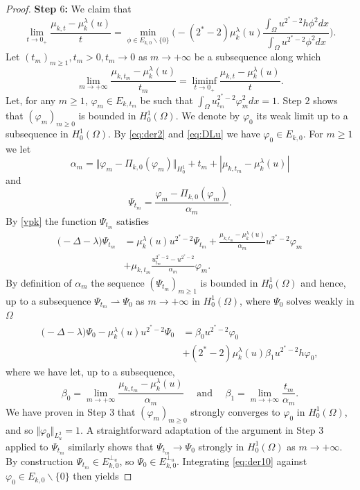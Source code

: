 \documentclass[10pt]{amsart}
\numberwithin{equation}{section}
\newcommand{\vp}{\varphi}
\newcommand{\Om}{\Omega}
\newcommand{\mkl}{\mu_{k}^{\lambda}}
\theoremstyle{plain}
\theoremstyle{remark}
\begin{document}
\begin{proof}
\medskip

 \textbf{Step $6$:} We claim that
 \begin{equation} \label{eq:der9}
\lim_{t \to 0_+} \frac{\mu_{k,t} - \mkl(u)}{t}= \min_{\phi \in E_{k,0}\backslash \{0\}} \Bigg( - (2^*-2) \mkl(u) \frac{\int_\Om u^{2^*-2}h \phi^2dx}{\int_\Om u^{2^*-2} \phi^2 dx}\Bigg).
\end{equation}
Let $(t_m)_{m \ge1}, t_m >0, t_m \to 0$ as $m \to + \infty $ be a subsequence along which 
$$ \lim_{m \to + \infty} \frac{\mu_{k,t_m} - \mkl(u)}{t_m}   = \liminf_{ t \to 0_+} \frac{\mu_{k,t} - \mkl(u)}{t}.$$
 Let, for any $m \ge 1$, $\vp_{m} \in E_{k,t_m}$ be such that $\int_\Om u_{t_m}^{2^*-2} \vp_{m}^2dx = 1$. Step $2$ shows that $(\vp_m)_{m\ge0}$ is bounded in $H^1_0(\Om)$. We denote by $\vp_0$ its weak limit up to a subsequence in $H^1_0(\Om)$. By \eqref{eq:der2} and \eqref{eq:DLu} we have $\vp_0 \in E_{k,0}$. For $m \ge 1$ we let 
$$ \alpha_m = \Vert \vp_{m} - \Pi_{k,0}(\vp_{m}) \Vert_{H^1_0} + t_m +  |\mu_{k,t_m} - \mkl(u)| $$
and 
$$ \Psi_{t_m} = \frac{\vp_{m} - \Pi_{k,0}(\vp_{m})}{\alpha_m}. $$
By \eqref{vpk} the function $\Psi_{t_m}$ satisfies
$$ \begin{aligned}
\big( - \Delta - \lambda \big) \Psi_{t_m}&  = \mkl(u) u^{2^*-2} \Psi_{t_m} + \frac{\mu_{k,t_m} - \mkl(u)}{\alpha_m} u^{2^*-2} \vp_{m} \\
&+ \mu_{k, t_m} \frac{u_{t_m}^{2^*-2} - u^{2^*-2}}{\alpha_m}\vp_{m}.
\end{aligned}$$ 
By definition of $\alpha_m$ the sequence $(\Psi_{t_m})_{m\ge1}$ is bounded in $H^1_0(\Om)$ and hence, up to a subsequence $\Psi_{t_m} \rightharpoonup \Psi_0$ as $m \to + \infty$ in $H^1_0(\Om)$, where $\Psi_0$ solves weakly in $\Om$
\begin{equation} \label{eq:der10}
 \begin{aligned}
 \big( - \Delta - \lambda \big) \Psi_0 -  \mkl(u) u^{2^*-2} \Psi_{0} & = \beta_0 u^{2^*-2} \vp_0 \\
 &+ (2^*-2) \mkl(u) \beta_1 u^{2^*-2} h \vp_0 ,
 \end{aligned} 
 \end{equation}
where we have let, up to a subsequence, 
 $$\beta_0 = \lim_{m \to +\infty} \frac{\mu_{k,t_m} - \mkl(u)}{\alpha_m} \quad \text{ and } \quad \beta_1 = \lim_{m \to +\infty} \frac{t_m}{\alpha_m}. $$
 We have proven in Step $3$ that $(\vp_m)_{m\ge0}$ strongly converges to $\vp_0$ in $H^1_0(\Om)$, and so $\Vert \vp_0 \Vert_{L^2_u} = 1$. A straightforward adaptation of the argument in Step $3$ applied to $\Psi_{t_m}$ similarly shows that $\Psi_{t_m} \to \Psi_0$ strongly in $H^1_0(\Om)$ as $m \to + \infty$. By construction $\Psi_{t_m} \in E_{k,0}^{\perp_{u}}$, so $\Psi_0 \in E_{k,0}^{\perp_u}$.  Integrating \eqref{eq:der10} against $\vp_0 \in E_{k,0}\backslash \{0\}$ then yields

\end{proof}
\end{document}

